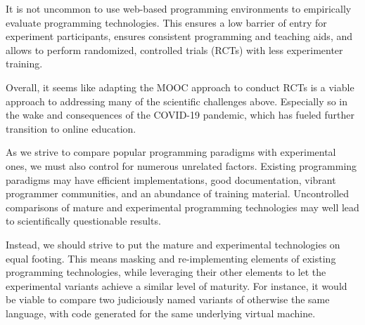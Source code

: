 It is not uncommon to use web-based programming environments to
empirically evaluate programming technologies\cite{2002-web-based}.
This ensures a low barrier of entry for experiment participants,
ensures consistent programming and teaching aids, and allows to
perform randomized, controlled trials (RCTs) with less experimenter
training.

Overall, it seems like adapting the MOOC approach to conduct RCTs is a
viable approach to addressing many of the scientific challenges above.
Especially so in the wake and consequences of the COVID-19 pandemic,
which has fueled further transition to online education.

As we strive to compare popular programming paradigms with
experimental ones, we must also control for numerous unrelated
factors.  Existing programming paradigms may have efficient
implementations, good documentation, vibrant programmer communities,
and an abundance of training material. Uncontrolled comparisons of
mature and experimental programming technologies may well lead to
scientifically questionable results.

Instead, we should strive to put the mature and experimental
technologies on equal footing. This means masking and re-implementing
elements of existing programming technologies, while leveraging their
other elements to let the experimental variants achieve a similar
level of maturity. For instance, it would be viable to compare two
judiciously named variants of otherwise the same language, with code
generated for the same underlying virtual machine.


 

